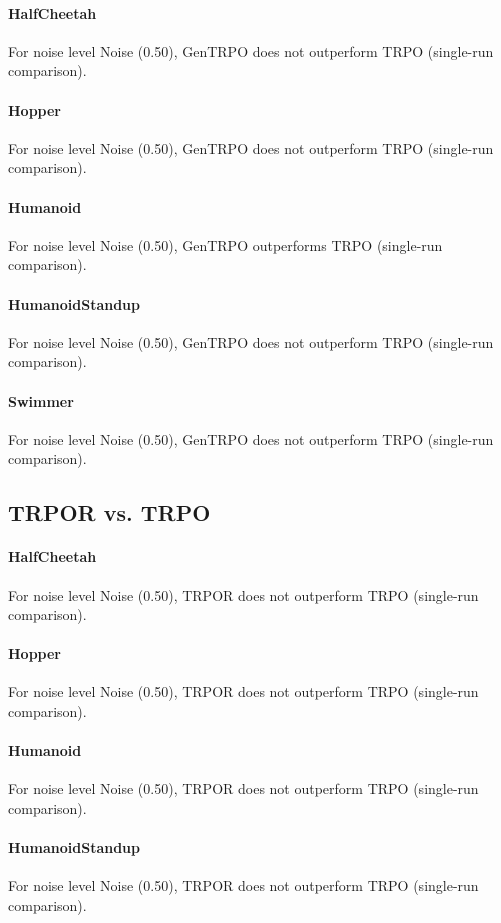 \paragraph{HalfCheetah}
For noise level Noise (0.50), GenTRPO does not outperform TRPO (single-run comparison).
\paragraph{Hopper}
For noise level Noise (0.50), GenTRPO does not outperform TRPO (single-run comparison).
\paragraph{Humanoid}
For noise level Noise (0.50), GenTRPO outperforms TRPO (single-run comparison).
\paragraph{HumanoidStandup}
For noise level Noise (0.50), GenTRPO does not outperform TRPO (single-run comparison).
\paragraph{Swimmer}
For noise level Noise (0.50), GenTRPO does not outperform TRPO (single-run comparison).
\subsection{TRPOR vs. TRPO}
\paragraph{HalfCheetah}
For noise level Noise (0.50), TRPOR does not outperform TRPO (single-run comparison).
\paragraph{Hopper}
For noise level Noise (0.50), TRPOR does not outperform TRPO (single-run comparison).
\paragraph{Humanoid}
For noise level Noise (0.50), TRPOR does not outperform TRPO (single-run comparison).
\paragraph{HumanoidStandup}
For noise level Noise (0.50), TRPOR does not outperform TRPO (single-run comparison).
